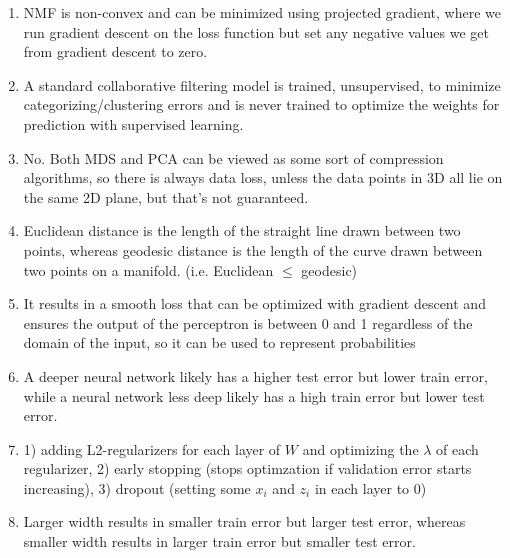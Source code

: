 \documentclass{article}
\def\enum#1{\begin{enumerate}#1\end{enumerate}}
\begin{document}
\enum{
\item NMF is non-convex and can be minimized using projected gradient, where we run gradient descent on the loss function but set any negative values we get from gradient descent to zero.
\item A standard collaborative filtering model is trained, unsupervised, to minimize categorizing/clustering errors and is never trained to optimize the weights for prediction with supervised learning.
\item No. Both MDS and PCA can be viewed as some sort of compression algorithms, so there is always data loss, unless the data points in 3D all lie on the same 2D plane, but that's not guaranteed.
\item Euclidean distance is the length of the straight line drawn between two points, whereas geodesic distance is the length of the curve drawn between two points on a manifold. (i.e. Euclidean $\leq$ geodesic)
\item It results in a smooth loss that can be optimized with gradient descent and ensures the output of the perceptron is between 0 and 1 regardless of the domain of the input, so it can be used to represent probabilities
\item A deeper neural network likely has a higher test error but lower train error, while a neural network less deep likely has a high train error but lower test error.
\item 1) adding L2-regularizers for each layer of $W$ and optimizing the $\lambda$ of each regularizer, 2) early stopping (stops optimzation if validation error starts increasing), 3) dropout (setting some $x_i$ and $z_i$ in each layer to 0)
\item  Larger width results in smaller train error but larger test error, whereas smaller width results in larger train error but smaller test error.
}
\end{document}
